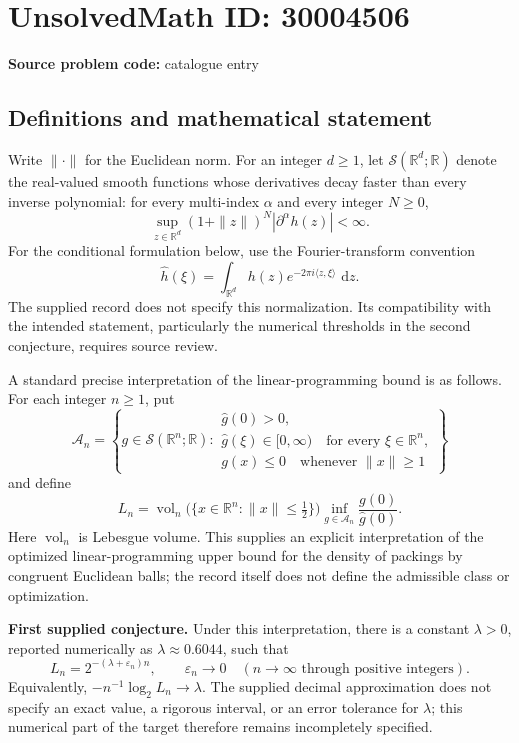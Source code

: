 \documentclass[11pt]{article}
\newcommand{\R}{\mathbb{R}}
\newcommand{\dd}{\,\mathrm{d}}
\begin{document}
\section*{UnsolvedMath ID: 30004506}
\textbf{Source problem code:} catalogue entry
\subsection{Definitions and mathematical statement}
Write \(\|\cdot\|\) for the Euclidean norm. For an integer \(d\geq1\), let \(\mathcal S(\R^d;\R)\) denote the real-valued smooth functions whose derivatives decay faster than every inverse polynomial: for every multi-index \(\alpha\) and every integer \(N\geq0\),
\[
\sup_{z\in\R^d}(1+\|z\|)^N|\partial^\alpha h(z)|<\infty.
\]
For the conditional formulation below, use the Fourier-transform convention
\[
\widehat h(\xi)=\int_{\R^d}h(z)e^{-2\pi i\langle z,\xi\rangle}\,\dd z.
\]
The supplied record does not specify this normalization. Its compatibility with the intended statement, particularly the numerical thresholds in the second conjecture, requires source review.

A standard precise interpretation of the linear-programming bound is as follows. For each integer \(n\geq1\), put
\[
\mathcal A_n=\left\{g\in\mathcal S(\R^n;\R):
\begin{array}{l}
\widehat g(0)>0,\\
\widehat g(\xi)\in[0,\infty)\quad\text{for every }\xi\in\R^n,\\
g(x)\leq0\quad\text{whenever }\|x\|\geq1
\end{array}\right\}
\]
and define
\[
L_n=\operatorname{vol}_n\bigl(\{x\in\R^n:\|x\|\leq\tfrac12\}\bigr)
\inf_{g\in\mathcal A_n}\frac{g(0)}{\widehat g(0)}.
\]
Here \(\operatorname{vol}_n\) is Lebesgue volume. This supplies an explicit interpretation of the optimized linear-programming upper bound for the density of packings by congruent Euclidean balls; the record itself does not define the admissible class or optimization.

\textbf{First supplied conjecture.} Under this interpretation, there is a constant \(\lambda>0\), reported numerically as \(\lambda\approx0.6044\), such that
\[
L_n=2^{-(\lambda+\varepsilon_n)n},\qquad \varepsilon_n\longrightarrow0
\quad(n\longrightarrow\infty\text{ through positive integers}).
\]
Equivalently, \(-n^{-1}\log_2 L_n\to\lambda\). The supplied decimal approximation does not specify an exact value, a rigorous interval, or an error tolerance for \(\lambda\); this numerical part of the target therefore remains incompletely specified.
\end{document}

